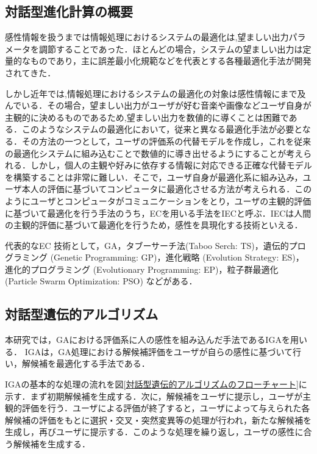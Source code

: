 \subsection{対話型進化計算の概要}
\label{sec2.2.1}

感性情報を扱うまでは情報処理におけるシステムの最適化は,望ましい出力パラメータを調節することであった．ほとんどの場合，システムの望ましい出力は定量的なものであり，主に誤差最小化規範などを代表とする各種最適化手法が開発されてきた\cite{GA2}．

しかし近年では,情報処理におけるシステムの最適化の対象は感性情報にまで及んでいる．その場合，望ましい出力がユーザが好む音楽や画像などユーザ自身が主観的に決めるものであるため,望ましい出力を数値的に導くことは困難である．このようなシステムの最適化において，従来と異なる最適化手法が必要となる．その方法の一つとして，ユーザの評価系の代替モデルを作成し，これを従来の最適化システムに組み込むことで数値的に導き出せるようにすることが考えられる．しかし，個人の主観や好みに依存する情報に対応できる正確な代替モデルを構築することは非常に難しい．そこで，ユーザ自身が最適化系に組み込み，ユーザ本人の評価に基づいてコンピュータに最適化させる方法が考えられる．このようにユーザとコンピュータがコミュニケーションをとり，ユーザの主観的評価に基づいて最適化を行う手法のうち，ECを用いる手法をIECと呼ぶ\cite{IEC}．IECは人間の主観的評価に基づいて最適化を行うため，感性を具現化する技術といえる．

代表的なEC 技術として，GA，タブーサーチ法(Taboo Serch: TS)，遺伝的プログラミング (Genetic Programming: GP)，進化戦略 (Evolution Strategy: ES)，進化的プログラミング (Evolutionary Programming: EP)，粒子群最適化 (Particle Swarm Optimization: PSO) などがある．
    
\subsection{対話型遺伝的アルゴリズム}
\label{sec2.2.2}

本研究では，GAにおける評価系に人の感性を組み込んだ手法であるIGAを用いる．
IGAは，GA処理における解候補評価をユーザが自らの感性に基づいて行い，解候補を最適化する手法である．

IGAの基本的な処理の流れを図\ref{対話型遺伝的アルゴリズムのフローチャート}に示す．まず初期解候補を生成する．次に，解候補をユーザに提示し，ユーザが主観的評価を行う．ユーザによる評価が終了すると，ユーザによって与えられた各解候補の評価をもとに選択・交叉・突然変異等の処理が行われ，新たな解候補を生成し，再びユーザに提示する．このような処理を繰り返し，ユーザの感性に合う解候補を生成する．


